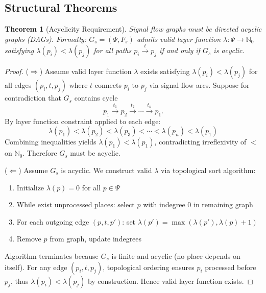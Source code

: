 \documentclass[10pt,letterpaper]{article}
\newtheorem{theorem}{Theorem}
\begin{document}
\subsection{Structural Theorems}

\begin{theorem}[Acyclicity Requirement]
Signal flow graphs must be directed acyclic graphs (DAGs). Formally: $G_s = (\Psi, F_s)$ admits valid layer function
$\lambda: \Psi \rightarrow \mathbb{N}_0$
satisfying $\lambda(p_i) < \lambda(p_j)$ for all paths $p_i \xrightarrow{t} p_j$ if and only if $G_s$ is acyclic.
\end{theorem}

\begin{proof}
($\Rightarrow$) Assume valid layer function $\lambda$ exists satisfying $\lambda(p_i) < \lambda(p_j)$ for all edges $(p_i,t,p_j)$ where $t$ connects $p_i$ to $p_j$ via signal flow arcs. Suppose for contradiction that $G_s$ contains cycle
\[
p_1 \xrightarrow{t_1} p_2 \xrightarrow{t_2} \cdots \xrightarrow{t_n} p_1.
\]
By layer function constraint applied to each edge:
\begin{equation*}
\lambda(p_1) < \lambda(p_2) < \lambda(p_3) < \cdots < \lambda(p_n) < \lambda(p_1)
\end{equation*}
Combining inequalities yields $\lambda(p_1) < \lambda(p_1)$, contradicting irreflexivity of $<$ on $\mathbb{N}_0$. Therefore $G_s$ must be acyclic.

($\Leftarrow$) Assume $G_s$ is acyclic. We construct valid $\lambda$ via topological sort algorithm:
\begin{enumerate}
\item Initialize $\lambda(p) = 0$ for all $p \in \Psi$
\item While exist unprocessed places: select $p$ with indegree 0 in remaining graph
\item For each outgoing edge $(p,t,p')$: set $\lambda(p') = \max(\lambda(p'), \lambda(p) + 1)$
\item Remove $p$ from graph, update indegrees
\end{enumerate}
Algorithm terminates because $G_s$ is finite and acyclic (no place depends on itself). For any edge $(p_i,t,p_j)$, topological ordering ensures $p_i$ processed before $p_j$, thus
$\lambda(p_i) < \lambda(p_j)$
by construction. Hence valid layer function exists.
\end{proof}
\end{document}
